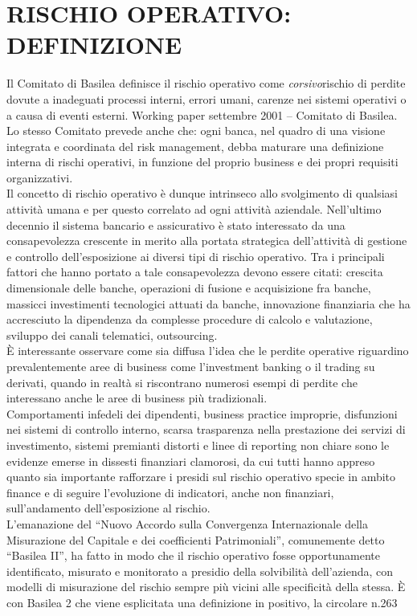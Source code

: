 \documentclass[a4paper,11pt]{article}
\begin{document}
\section{RISCHIO OPERATIVO: DEFINIZIONE}
 Il Comitato di Basilea definisce il rischio operativo come \textit{corsivo}rischio di perdite dovute a inadeguati processi interni, errori umani, carenze nei sistemi operativi o a causa di eventi esterni. Working paper settembre 2001 –  Comitato di Basilea. Lo stesso Comitato prevede anche che: ogni banca, nel quadro di una visione integrata e coordinata del risk management, debba maturare una definizione interna di rischi operativi, in funzione del proprio business e dei propri requisiti organizzativi.\\
 Il concetto di rischio operativo è dunque intrinseco allo svolgimento di qualsiasi attività umana e per questo correlato ad ogni attività aziendale. Nell’ultimo decennio il sistema bancario e assicurativo è stato interessato da una consapevolezza crescente in merito alla portata strategica dell’attività di gestione e controllo dell’esposizione ai diversi tipi di rischio operativo. Tra i principali fattori che hanno portato a tale consapevolezza devono essere citati: crescita dimensionale delle banche, operazioni di fusione e acquisizione fra banche, massicci investimenti tecnologici attuati da banche, innovazione finanziaria che ha accresciuto la dipendenza da complesse procedure di calcolo e valutazione, sviluppo dei canali telematici, outsourcing. \\
È interessante osservare come sia diffusa l’idea che le perdite operative riguardino prevalentemente aree di business come l’investment banking o il trading su derivati, quando in realtà si riscontrano numerosi esempi di perdite che interessano anche le aree di business più tradizionali. \\
Comportamenti infedeli dei dipendenti, business practice improprie, disfunzioni nei sistemi di controllo interno, scarsa trasparenza nella prestazione dei servizi di investimento, sistemi premianti distorti e linee di reporting non chiare sono le evidenze emerse in dissesti finanziari clamorosi, da cui tutti hanno appreso quanto sia importante rafforzare i presidi sul rischio operativo specie in ambito finance e di seguire l’evoluzione di indicatori, anche non finanziari, sull’andamento dell’esposizione al rischio. \\
L’emanazione del “Nuovo Accordo sulla Convergenza Internazionale della Misurazione del Capitale e dei coefficienti Patrimoniali”, comunemente detto “Basilea II”, ha fatto in modo che il rischio operativo fosse opportunamente identificato, misurato e monitorato a presidio della solvibilità dell’azienda, con modelli di misurazione del rischio sempre più vicini alle specificità della stessa. È con Basilea 2 che viene esplicitata una definizione in positivo, la circolare n.263 
\end{document}
